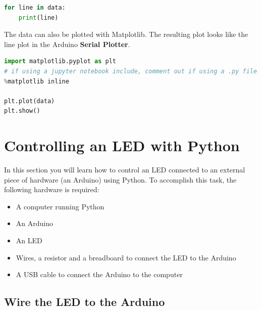 \documentclass{book}
\providecommand{\tightlist}{%
      \setlength{\itemsep}{0pt}\setlength{\parskip}{0pt}}
\begin{document}
    
        \begin{lstlisting}[language=Python]
for line in data:
    print(line)
\end{lstlisting}
    




    
        The data can also be plotted with Matplotlib. The resulting plot looks
like the line plot in the Arduino \textbf{Serial Plotter}.
    




    
        \begin{lstlisting}[language=Python]
import matplotlib.pyplot as plt
# if using a jupyter notebook include, comment out if using a .py file
%matplotlib inline

plt.plot(data)
plt.show()
\end{lstlisting}
    




    
        \section{Controlling an LED with
Python}\label{controlling-an-led-with-python}
    




    
        In this section you will learn how to control an LED connected to an
external piece of hardware (an Arduino) using Python. To accomplish this
task, the following hardware is required:

\begin{itemize}
\tightlist
\item
  A computer running Python
\item
  An Arduino
\item
  An LED
\item
  Wires, a resistor and a breadboard to connect the LED to the Arduino
\item
  A USB cable to connect the Arduino to the computer
\end{itemize}
    




    
        \subsection{Wire the LED to the
Arduino}\label{wire-the-led-to-the-arduino}
    
\end{document}
